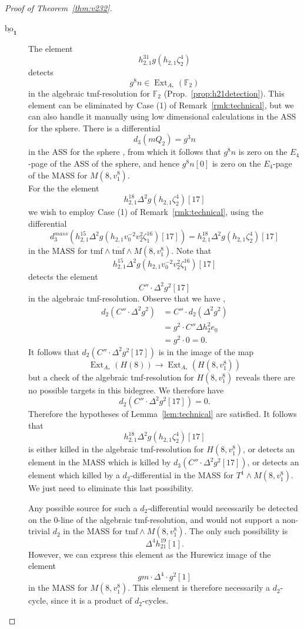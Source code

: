 \documentclass[10pt]{amsart}
\newcommand{\ul}[1]{\underline{#1}}
\newcommand{\br}[1]{\overline{#1}}
\newcommand{\FF}{\mathbb{F}}
\newcommand{\tmf}{\mathrm{tmf}}
\newcommand{\bo}{\mathrm{bo}}
\newcommand{\bou}{\ul{\bo}}
\theoremstyle{definition}
\numberwithin{equation}{section}
\numberwithin{figure}{section}
\DeclareMathOperator{\Ext}{Ext}
\begin{document}
\begin{proof}[Proof of Theorem~\ref{thm:v232}]
\begin{description}
\item[$\pmb{\bou_1}$] 
The element
$$h_{2,1}^{31}g(h_{2,1}\zeta_2^4)$$
detects 
$$ g^8 n \in \Ext_{A_*}(\FF_2) $$
in the algebraic tmf-resolution for $\FF_2$ (Prop.~\ref{prop:h21detection}).  
This element can be eliminated by Case (1) of Remark~\ref{rmk:technical}, but we can also handle it manually using low dimensional calculations in the ASS for the sphere.
There is a differential
$$ d_3 (mQ_2) = g^3n $$
in the ASS for the sphere \cite{IWX2}, from which it follows that $g^8 n$ is zero on the $E_4$-page of the ASS of the sphere, and hence $g^8 n[0]$ is zero on the $E_4$-page of the MASS for $M(8,v_1^8)$. 
$$ \quad $$
For the the element
$$ h_{2,1}^{18} \Delta^2 g(h_{2,1}\zeta_2^4)[17] $$
we wish to employ Case (1) of Remark~\ref{rmk:technical}, using the differential
$$ d^{mass}_3(h^{15}_{2,1}\Delta^2 g(h_{2,1}v_0^{-2}v_2^2\zeta_1^{16})[17]) = h_{2,1}^{18} \Delta^2 g(h_{2,1}\zeta_2^4)[17] $$
in the MASS for $\tmf \wedge \br{\tmf} \wedge M(8,v_1^8)$.
Note that 
$$ h^{15}_{2,1}\Delta^2 g(h_{2,1}v_0^{-2}v_2^2\zeta_1^{16})[17] $$
detects the element
$$ C'' \cdot \Delta^2 g^2[17] $$
in the algebraic tmf-resolution.
Observe that  we have \cite{IsaksenChart}, \cite{Bruner}
\begin{align*}
d_2(C'' \cdot \Delta^2g^2) 
& = C'' \cdot d_2(\Delta^2 g^2) \\
& = g^2 \cdot C'' \Delta h_2^2 e_0 \\
& = g^2 \cdot 0 = 0.
\end{align*} 
It follows that $d_2(C'' \cdot \Delta^2g^2[17])$ is in the image of the map
$$ \Ext_{A_*}(H(8)) \rightarrow \Ext_{A_*}(H(8,v_1^8)) $$
but a check of the algebraic tmf-resolution for $H(8,v_1^8)$ reveals there are no possible targets in this bidegree.
We therefore have
$$ d_2(C'' \cdot \Delta^2 g^2[17]) = 0. $$
Therefore the hypotheses of Lemma~\ref{lem:technical} are satisfied.
It follows that 
$$ h_{2,1}^{18} \Delta^2 g(h_{2,1}\zeta_2^4)[17] $$
is either killed in the algebraic tmf-resolution for $H(8,v_1^8)$, 
or detects an element in the MASS which is killed by $d_3(C'' \cdot \Delta^2g^2[17])$,
 or detects an element which killed by a $d_2$-differential in the MASS for $T^1 \wedge M(8,v_1^8)$.  We just need to eliminate this last possibility.
 
 Any possible source for such a $d_2$-differential would necessarily be detected on the $0$-line of the algebraic tmf-resolution, and would not support a non-trivial $d_2$ in the MASS for $\tmf \wedge M(8,v_1^8)$.  The only such possibility is
$$ \Delta^4 h_{21}^{19}[1]. $$
However, we can express this element as the Hurewicz image of 
the element 
$$ gm \cdot \Delta^4 \cdot g^2[1] $$
in the MASS for $M(8,v_1^8)$.  This element is therefore necessarily a $d_2$-cycle, since it is a product of $d_2$-cycles.
\vspace{10pt}


\end{description}
\end{proof}
\end{document}
